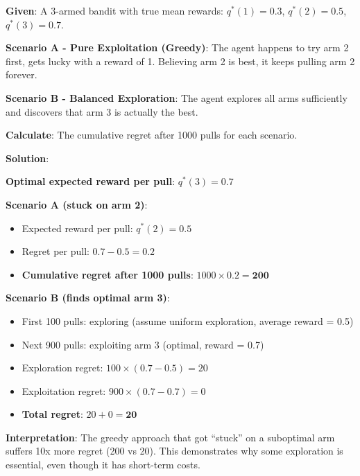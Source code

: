 \documentclass[11pt,a4paper]{article}
\begin{document}
\begin{tcolorbox}[colback=blue!5!white,colframe=blue!75!black,title=\textbf{Worked Example: Regret Analysis in Exploration-Exploitation}]
\textbf{Given}: A 3-armed bandit with true mean rewards: $q^*(1) = 0.3$, $q^*(2) = 0.5$, $q^*(3) = 0.7$.

\textbf{Scenario A - Pure Exploitation (Greedy)}: The agent happens to try arm 2 first, gets lucky with a reward of 1. Believing arm 2 is best, it keeps pulling arm 2 forever.

\textbf{Scenario B - Balanced Exploration}: The agent explores all arms sufficiently and discovers that arm 3 is actually the best.

\textbf{Calculate}: The cumulative regret after 1000 pulls for each scenario.

\textbf{Solution}:

\textbf{Optimal expected reward per pull}: $q^*(3) = 0.7$

\textbf{Scenario A (stuck on arm 2)}:
\begin{itemize}
    \item Expected reward per pull: $q^*(2) = 0.5$
    \item Regret per pull: $0.7 - 0.5 = 0.2$
    \item \textbf{Cumulative regret after 1000 pulls}: $1000 \times 0.2 = \mathbf{200}$
\end{itemize}

\textbf{Scenario B (finds optimal arm 3)}:
\begin{itemize}
    \item First 100 pulls: exploring (assume uniform exploration, average reward = 0.5)
    \item Next 900 pulls: exploiting arm 3 (optimal, reward = 0.7)
    \item Exploration regret: $100 \times (0.7 - 0.5) = 20$
    \item Exploitation regret: $900 \times (0.7 - 0.7) = 0$
    \item \textbf{Total regret}: $20 + 0 = \mathbf{20}$
\end{itemize}

\textbf{Interpretation}: The greedy approach that got ``stuck'' on a suboptimal arm suffers 10x more regret (200 vs 20). This demonstrates why some exploration is essential, even though it has short-term costs.
\end{tcolorbox}
\end{document}
